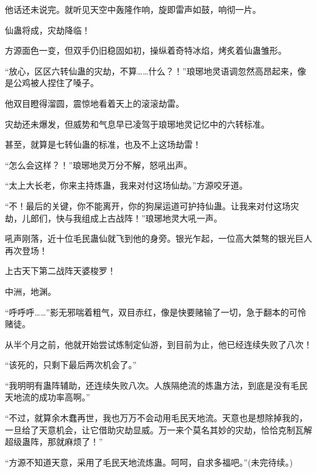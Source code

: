 \begin{this_body}
他话还未说完。就听见天空中轰隆作响，旋即雷声如鼓，响彻一片。

仙蛊将成，灾劫降临！

方源面色一变，但双手仍旧稳固如初，操纵着奇特冰焰，烤炙着仙蛊雏形。

“放心，区区六转仙蛊的灾劫，不算……什么？！”琅琊地灵语调忽然高昂起来，像是公鸡被人捏住了嗓子。

他双目瞪得溜圆，震惊地看着天上的滚滚劫雷。

灾劫还未爆发，但威势和气息早已凌驾于琅琊地灵记忆中的六转标准。

甚至，就算是七转仙蛊的标准，也及不上这场劫雷！

“怎么会这样？！”琅琊地灵万分不解，怒吼出声。

“太上大长老，你来主持炼蛊，我来对付这场仙劫。”方源咬牙道。

“不！最后的关键，你不能离开，你的狗屎运道可护持仙蛊。让我来对付这场灾劫，儿郎们，快与我组成上古战阵！”琅琊地灵大吼一声。

吼声刚落，近十位毛民蛊仙就飞到他的身旁。银光乍起，一位高大桀骜的银光巨人再次登场！

上古天下第二战阵天婆梭罗！

中洲，地渊。

“呼呼呼……”影无邪喘着粗气，双目赤红，像是快要赌输了一切，急于翻本的可怜赌徒。

从半个月之前，他就开始尝试炼制定仙游，到目前为止，他已经连续失败了八次！

“该死的，只剩下最后两次机会了。”

“我明明有蛊阵辅助，还连续失败八次。人族隔绝流的炼蛊方法，到底是没有毛民天地流的成功率高啊。”

“不过，就算余木蠢再世，我也万万不会动用毛民天地流。天意也是想除掉我的，一旦给了天意机会，让它借助灾劫显威。万一来个莫名其妙的灾劫，恰恰克制瓦解超级蛊阵，那就麻烦了！”

“方源不知道天意，采用了毛民天地流炼蛊。呵呵，自求多福吧。”(未完待续。)

\end{this_body}


